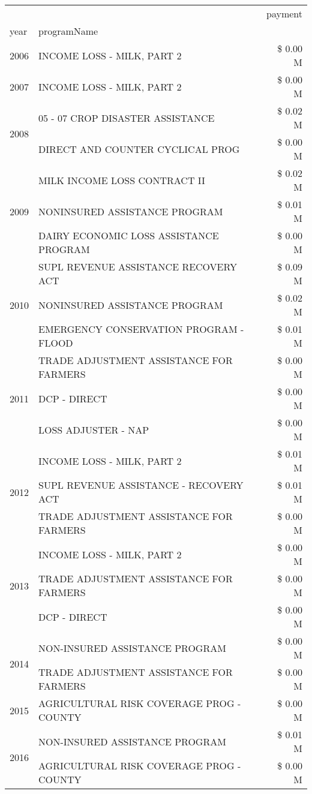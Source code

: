 \begin{tabular}{llr}
\toprule
 &  & payment \\
year & programName &  \\
\midrule
2006 & INCOME LOSS - MILK, PART 2 & \$ 0.00 M \\
\cline{1-3}
2007 & INCOME LOSS - MILK, PART 2 & \$ 0.00 M \\
\cline{1-3}
\multirow[t]{2}{*}{2008} & 05 - 07 CROP DISASTER ASSISTANCE & \$ 0.02 M \\
 & DIRECT AND COUNTER CYCLICAL PROG & \$ 0.00 M \\
\cline{1-3}
\multirow[t]{3}{*}{2009} & MILK INCOME LOSS CONTRACT II & \$ 0.02 M \\
 & NONINSURED ASSISTANCE PROGRAM & \$ 0.01 M \\
 & DAIRY ECONOMIC LOSS ASSISTANCE PROGRAM & \$ 0.00 M \\
\cline{1-3}
\multirow[t]{3}{*}{2010} & SUPL REVENUE ASSISTANCE RECOVERY ACT & \$ 0.09 M \\
 & NONINSURED ASSISTANCE PROGRAM & \$ 0.02 M \\
 & EMERGENCY CONSERVATION PROGRAM - FLOOD & \$ 0.01 M \\
\cline{1-3}
\multirow[t]{3}{*}{2011} & TRADE ADJUSTMENT ASSISTANCE FOR FARMERS & \$ 0.00 M \\
 & DCP - DIRECT & \$ 0.00 M \\
 & LOSS ADJUSTER - NAP & \$ 0.00 M \\
\cline{1-3}
\multirow[t]{3}{*}{2012} & INCOME LOSS - MILK, PART 2 & \$ 0.01 M \\
 & SUPL REVENUE ASSISTANCE - RECOVERY ACT & \$ 0.01 M \\
 & TRADE ADJUSTMENT ASSISTANCE FOR FARMERS & \$ 0.00 M \\
\cline{1-3}
\multirow[t]{3}{*}{2013} & INCOME LOSS - MILK, PART 2 & \$ 0.00 M \\
 & TRADE ADJUSTMENT ASSISTANCE FOR FARMERS & \$ 0.00 M \\
 & DCP - DIRECT & \$ 0.00 M \\
\cline{1-3}
\multirow[t]{2}{*}{2014} & NON-INSURED ASSISTANCE PROGRAM & \$ 0.00 M \\
 & TRADE ADJUSTMENT ASSISTANCE FOR FARMERS & \$ 0.00 M \\
\cline{1-3}
2015 & AGRICULTURAL RISK COVERAGE PROG - COUNTY & \$ 0.00 M \\
\cline{1-3}
\multirow[t]{3}{*}{2016} & NON-INSURED ASSISTANCE PROGRAM & \$ 0.01 M \\
 & AGRICULTURAL RISK COVERAGE PROG - COUNTY & \$ 0.00 M \\

\end{tabular}
